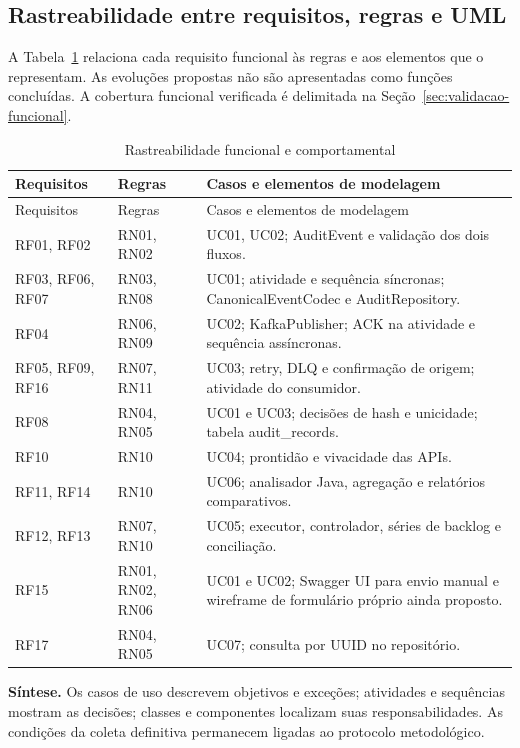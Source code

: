\subsection{Rastreabilidade entre requisitos, regras e UML}
A Tabela~\ref{tab:rastreabilidade} relaciona cada requisito funcional às regras e aos elementos que o representam. As evoluções propostas não são apresentadas como funções concluídas. A cobertura funcional verificada é delimitada na Seção~\ref{sec:validacao-funcional}.
{\small
\begin{longtable}{p{}p{}p{}}
\caption{Rastreabilidade funcional e comportamental}\label{tab:rastreabilidade}\\
\hline Requisitos & Regras & Casos e elementos de modelagem\\ \hline
\endfirsthead
\hline Requisitos & Regras & Casos e elementos de modelagem\\ \hline
\endhead
RF01, RF02 & RN01, RN02 & UC01, UC02; AuditEvent e validação dos dois fluxos.\\ \hline
RF03, RF06, RF07 & RN03, RN08 & UC01; atividade e sequência síncronas; CanonicalEventCodec e AuditRepository.\\ \hline
RF04 & RN06, RN09 & UC02; KafkaPublisher; ACK na atividade e sequência assíncronas.\\ \hline
RF05, RF09, RF16 & RN07, RN11 & UC03; retry, DLQ e confirmação de origem; atividade do consumidor.\\ \hline
RF08 & RN04, RN05 & UC01 e UC03; decisões de hash e unicidade; tabela audit\_records.\\ \hline
RF10 & RN10 & UC04; prontidão e vivacidade das APIs.\\ \hline
RF11, RF14 & RN10 & UC06; analisador Java, agregação e relatórios comparativos.\\ \hline
RF12, RF13 & RN07, RN10 & UC05; executor, controlador, séries de backlog e conciliação.\\ \hline
RF15 & RN01, RN02, RN06 & UC01 e UC02; Swagger UI para envio manual e wireframe de formulário próprio ainda proposto.\\ \hline
RF17 & RN04, RN05 & UC07; consulta por UUID no repositório.\\ \hline
\end{longtable}
\par
}
\textbf{Síntese.} Os casos de uso descrevem objetivos e exceções; atividades e sequências mostram as decisões; classes e componentes localizam suas responsabilidades. As condições da coleta definitiva permanecem ligadas ao protocolo metodológico.
